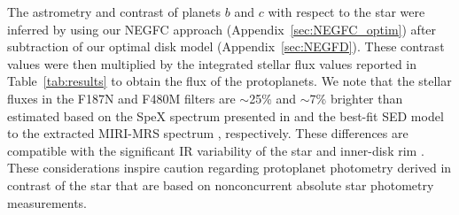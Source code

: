 \documentclass[longauth]{aa}
\newcommand{\vc}[1]{#1}
\begin{document}
The astrometry and contrast of planets $b$ and $c$ with respect to the star were inferred by using %
our NEGFC approach (Appendix~\ref{sec:NEGFC_optim}) after subtraction of our optimal disk model (Appendix~\ref{sec:NEGFD}). These contrast values were then multiplied by the integrated stellar flux values reported in Table~\ref{tab:results} to obtain the flux of the protoplanets. We note that the stellar fluxes in the F187N and F480M filters are $\sim$25\% and $\sim$7\% brighter than estimated based on the %
SpeX spectrum presented in \citet{Long2018} and the best-fit SED model to the extracted MIRI-MRS spectrum \citep[][%
]{Perotti2023}, respectively. %
These differences are %
compatible with the significant %
IR variability of the star and inner-disk rim %
\citep[e.g., $\sim$25\% variation at $\sim$5\,$\upmu$m between Spitzer and JWST observations;%
][]{Perotti2023}. %
These considerations inspire caution regarding protoplanet photometry derived in contrast of the star \vc{that are} based on nonconcurrent absolute star photometry measurements. %
\end{document}
